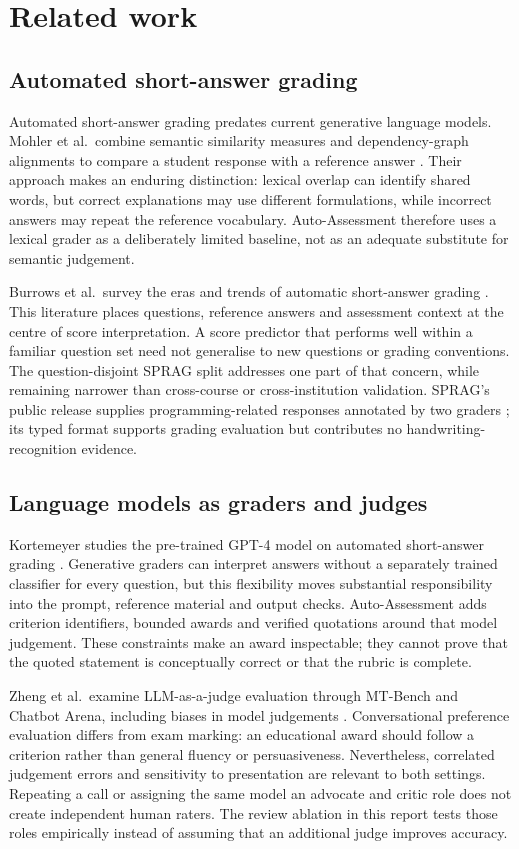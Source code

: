 \section{Related work}
\subsection{Automated short-answer grading}
Automated short-answer grading predates current generative language models. Mohler et al.\ combine semantic similarity measures and dependency-graph alignments to compare a student response with a reference answer \citep{mohler2011learning}. Their approach makes an enduring distinction: lexical overlap can identify shared words, but correct explanations may use different formulations, while incorrect answers may repeat the reference vocabulary. Auto-Assessment therefore uses a lexical grader as a deliberately limited baseline, not as an adequate substitute for semantic judgement.

Burrows et al.\ survey the eras and trends of automatic short-answer grading \citep{burrows2015eras}. This literature places questions, reference answers and assessment context at the centre of score interpretation. A score predictor that performs well within a familiar question set need not generalise to new questions or grading conventions. The question-disjoint SPRAG split addresses one part of that concern, while remaining narrower than cross-course or cross-institution validation. SPRAG's public release supplies programming-related responses annotated by two graders \citep{sprag2025}; its typed format supports grading evaluation but contributes no handwriting-recognition evidence.

\subsection{Language models as graders and judges}
Kortemeyer studies the pre-trained GPT-4 model on automated short-answer grading \citep{kortemeyer2023grading}. Generative graders can interpret answers without a separately trained classifier for every question, but this flexibility moves substantial responsibility into the prompt, reference material and output checks. Auto-Assessment adds criterion identifiers, bounded awards and verified quotations around that model judgement. These constraints make an award inspectable; they cannot prove that the quoted statement is conceptually correct or that the rubric is complete.

Zheng et al.\ examine LLM-as-a-judge evaluation through MT-Bench and Chatbot Arena, including biases in model judgements \citep{zheng2024judging}. Conversational preference evaluation differs from exam marking: an educational award should follow a criterion rather than general fluency or persuasiveness. Nevertheless, correlated judgement errors and sensitivity to presentation are relevant to both settings. Repeating a call or assigning the same model an advocate and critic role does not create independent human raters. The review ablation in this report tests those roles empirically instead of assuming that an additional judge improves accuracy.

